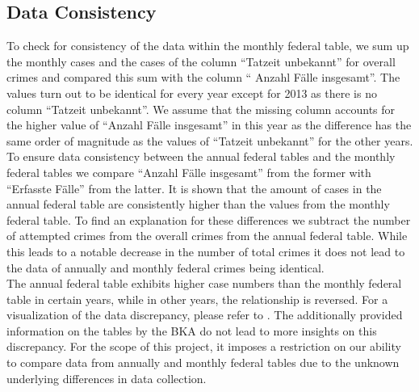 \documentclass{article}
\theoremstyle{plain}
\theoremstyle{definition}
\theoremstyle{remark}
\begin{document}
\subsection{Data Consistency}
\label{temp_data_consistency}
To check for consistency of the data within the monthly federal table, we sum up the monthly cases and the cases of the column \textquotedblleft{}Tatzeit unbekannt\textquotedblright{} for overall crimes and compared this sum with the column \textquotedblleft{} Anzahl Fälle insgesamt\textquotedblright{}. The values turn out to be identical for every year except for 2013 as there is no column \textquotedblleft{}Tatzeit unbekannt\textquotedblright{}. We assume that the missing column accounts for the higher value of \textquotedblleft{}Anzahl Fälle insgesamt\textquotedblright{} in this year as the difference has the same order of magnitude as the values of \textquotedblleft{}Tatzeit unbekannt\textquotedblright{} for the other years. \\
To ensure data consistency between the annual federal tables and the monthly federal tables we compare \textquotedblleft{}Anzahl Fälle insgesamt\textquotedblright{} from the former with \textquotedblleft{}Erfasste Fälle\textquotedblright{} from the latter. It is shown that the amount of cases in the annual federal table are consistently higher than the values from the monthly federal table. To find an explanation for these differences we subtract the number of attempted crimes from the overall crimes from the annual federal table. While this leads to a notable decrease in the number of total crimes it does not lead to the data of annually and monthly federal crimes being identical.\\
The annual federal table exhibits higher case numbers than the monthly federal table in certain years, while in other years, the relationship is reversed. For a visualization of the data discrepancy, please refer to \citet{GitHubTemporal}. The additionally provided information on the tables by the BKA do not lead to more insights on this discrepancy. For the scope of this project, it imposes a restriction on our ability to compare data from annually and monthly federal tables due to the unknown underlying 
differences in data collection.
\end{document}

